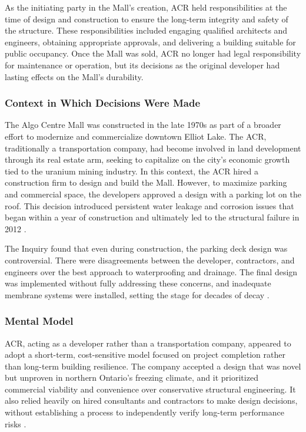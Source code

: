 \documentclass[12pt]{article}
\begin{document}
As the initiating party in the Mall’s creation, ACR held responsibilities at the time of design and construction to ensure the long-term integrity and safety of the structure. These responsibilities included engaging qualified architects and engineers, obtaining appropriate approvals, and delivering a building suitable for public occupancy. Once the Mall was sold, ACR no longer had legal responsibility for maintenance or operation, but its decisions as the original developer had lasting effects on the Mall’s durability.

\subsubsection*{Context in Which Decisions Were Made}

The Algo Centre Mall was constructed in the late 1970s as part of a broader effort to modernize and commercialize downtown Elliot Lake. The ACR, traditionally a transportation company, had become involved in land development through its real estate arm, seeking to capitalize on the city’s economic growth tied to the uranium mining industry. In this context, the ACR hired a construction firm to design and build the Mall. However, to maximize parking and commercial space, the developers approved a design with a parking lot on the roof. This decision introduced persistent water leakage and corrosion issues that began within a year of construction and ultimately led to the structural failure in 2012 \cite[p66–68]{AlgoLakeReport1}.

The Inquiry found that even during construction, the parking deck design was controversial. There were disagreements between the developer, contractors, and engineers over the best approach to waterproofing and drainage. The final design was implemented without fully addressing these concerns, and inadequate membrane systems were installed, setting the stage for decades of decay \cite[p68-70]{AlgoLakeReport1}.

\subsubsection*{Mental Model}

ACR, acting as a developer rather than a transportation company, appeared to adopt a short-term, cost-sensitive model focused on project completion rather than long-term building resilience. The company accepted a design that was novel but unproven in northern Ontario’s freezing climate, and it prioritized commercial viability and convenience over conservative structural engineering. It also relied heavily on hired consultants and contractors to make design decisions, without establishing a process to independently verify long-term performance risks \cite[p69–70]{AlgoLakeReport1}.
\end{document}
